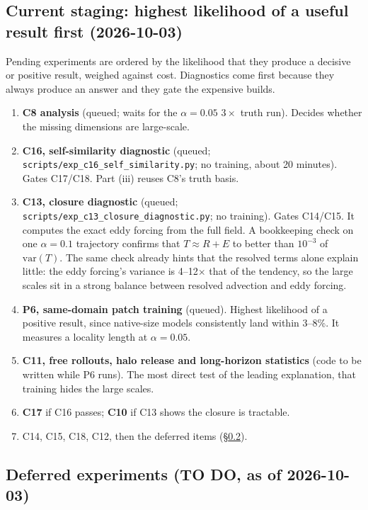 \documentclass[11pt]{article}
\begin{document}
\subsection{Current staging: highest likelihood of a useful result first (2026-10-03)}
\label{sec:staging}

Pending experiments are ordered by the likelihood that they produce a
decisive or positive result, weighed against cost. Diagnostics come
first because they always produce an answer and they gate the expensive
builds.
\begin{enumerate}[leftmargin=*]
\item \textbf{C8 analysis} (queued; waits for the $\alpha{=}0.05$
  $3\times$ truth run). Decides whether the missing dimensions are
  large-scale.
\item \textbf{C16, self-similarity diagnostic} (queued;
  \texttt{scripts/exp\_c16\_self\_similarity.py}; no training, about 20
  minutes). Gates C17/C18. Part (iii) reuses C8's truth basis.
\item \textbf{C13, closure diagnostic} (queued;
  \texttt{scripts/exp\_c13\_closure\_diagnostic.py}; no training). Gates
  C14/C15. It computes the exact eddy forcing from the full field. A
  bookkeeping check on one $\alpha{=}0.1$ trajectory confirms that
  $T\approx R+E$ to better than $10^{-3}$ of $\mathrm{var}(T)$. The same
  check already hints that the resolved terms alone explain little: the
  eddy forcing's variance is 4--12$\times$ that of the tendency, so the
  large scales sit in a strong balance between resolved advection and
  eddy forcing.
\item \textbf{P6, same-domain patch training} (queued). Highest
  likelihood of a positive result, since native-size models consistently
  land within 3--8\%. It measures a locality length at
  $\alpha{=}0.05$.
\item \textbf{C11, free rollouts, halo release and long-horizon
  statistics} (code to be written while P6 runs). The most direct test
  of the leading explanation, that training hides the large scales.
\item \textbf{C17} if C16 passes; \textbf{C10} if C13 shows the closure
  is tractable.
\item C14, C15, C18, C12, then the deferred items
  (\S\ref{sec:todo_deferred}).
\end{enumerate}

\subsection{Deferred experiments (TO DO, as of 2026-10-03)}
\label{sec:todo_deferred}
\end{document}
